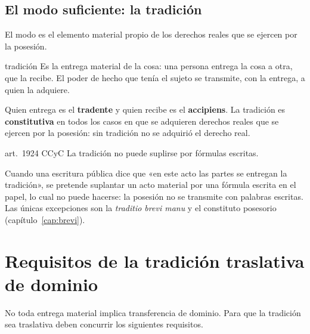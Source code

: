 \documentclass[12pt,oneside]{book}
\begin{document}
\subsection{El modo suficiente: la tradición}

El modo es el elemento material propio de los derechos reales que se ejercen por la posesión.

\begin{definicion}{tradición}
Es la entrega material de la cosa: una persona entrega la cosa a otra, que la recibe. El poder de hecho que tenía el sujeto se transmite, con la entrega, a quien la adquiere.
\end{definicion}

Quien entrega es el \textbf{tradente} y quien recibe es el \textbf{accipiens}. La tradición es \textbf{constitutiva} en todos los casos en que se adquieren derechos reales que se ejercen por la posesión: sin tradición no se adquirió el derecho real.

\begin{regla}{art.~1924 CCyC}
La tradición no puede suplirse por fórmulas escritas.
\end{regla}

Cuando una escritura pública dice que «en este acto las partes se entregan la tradición», se pretende suplantar un acto material por una fórmula escrita en el papel, lo cual no puede hacerse: la posesión no se transmite con palabras escritas. Las únicas excepciones son la \textit{traditio brevi manu} y el constituto posesorio (capítulo~\ref{cap:brevi}).

\section{Requisitos de la tradición traslativa de dominio}

No toda entrega material implica transferencia de dominio. Para que la tradición sea traslativa deben concurrir los siguientes requisitos.
\end{document}
